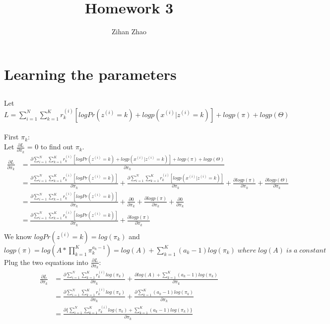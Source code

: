 \documentclass{article}
\author{Zihan Zhao}
\affil{1001103708}
\title{Homework 3}
\date{}
\begin{document}
\maketitle
\section{Learning the parameters}
\subsection{}
Let $L = \sum_{i = 1}^{N} \sum_{k = 1}^{K} r_k^{(i)}[logPr(z^{(i)}=k)+logp(x^{(i)}|z^{(i)}=k)]+logp(\pi)+logp(\Theta)$\\\\
First $\pi_k$:\\
Let $\frac{\partial L}{\partial \pi_k}$ = 0 to find out $\pi_k$.
\begin{align*}
    \frac{\partial L}{\partial \pi_k} &= \frac{\partial \sum_{i = 1}^{N} \sum_{k = 1}^{K} r_k^{(i)}[logPr(z^{(i)}=k)+logp(x^{(i)}|z^{(i)}=k)]+logp(\pi)+logp(\Theta)}{\partial \pi_k}\\
    &= \frac{\partial \sum_{i = 1}^{N} \sum_{k = 1}^{K} r_k^{(i)}[logPr(z^{(i)}=k)]}{\partial \pi_k} + \frac{\partial \sum_{i = 1}^{N} \sum_{k = 1}^{K} r_k^{(i)}[logp(x^{(i)}|z^{(i)}=k)]}{\partial \pi_k} + \frac{\partial logp(\pi)}{\partial \pi_k} + \frac{\partial logp(\Theta)}{\partial \pi_k}\\
    &= \frac{\partial \sum_{i = 1}^{N} \sum_{k = 1}^{K} r_k^{(i)}[logPr(z^{(i)}=k)]}{\partial \pi_k} + \frac{\partial 0}{\partial \pi_k} + \frac{\partial logp(\pi)}{\partial \pi_k} + \frac{\partial 0}{\partial \pi_k}\\
    &= \frac{\partial \sum_{i = 1}^{N} \sum_{k = 1}^{K} r_k^{(i)}[logPr(z^{(i)}=k)]}{\partial \pi_k} + \frac{\partial logp(\pi)}{\partial \pi_k}\\
\end{align*}
We know $logPr(z^{(i)}=k) = log(\pi_k)$ and \\$logp(\pi)=log(A*\prod_{k=1}^{K}\pi_k^{a_k-1}) = log(A)+\sum_{k=1}^{K}(a_k-1)log(\pi_k)\;where\;log(A)\;is\;a\;constant$\\
Plug the two equations into $\frac{\partial L}{\partial \pi_k}$:
\begin{align*}
    \frac{\partial L}{\partial \pi_k} &= \frac{\partial \sum_{i = 1}^{N} \sum_{k = 1}^{K} r_k^{(i)}log(\pi_k)}{\partial \pi_k} + \frac{\partial log(A)+\sum_{k=1}^{K}(a_k-1)log(\pi_k)}{\partial \pi_k}\\
    &= \frac{\partial \sum_{i = 1}^{N} \sum_{k = 1}^{K} r_k^{(i)}log(\pi_k)}{\partial \pi_k} + \frac{\partial \sum_{k=1}^{K}(a_k-1)log(\pi_k)}{\partial \pi_k}\\
    &= \frac{\partial \{\sum_{i = 1}^{N} \sum_{k = 1}^{K} r_k^{(i)}log(\pi_k)+\sum_{k=1}^{K}(a_k-1)log(\pi_k)\}}{\partial \pi_k}\\
\end{align*}
\end{document}
